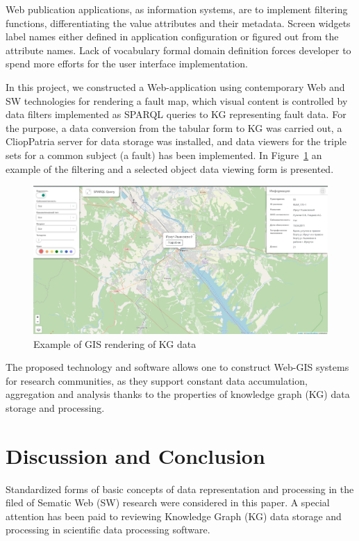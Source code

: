 \documentclass[
]{ceurart}
\begin{document}
Web publication applications, as information systems, are to implement filtering functions, differentiating the value attributes and their metadata.  Screen widgets label names either defined in application configuration or figured out from the attribute names.  Lack of vocabulary formal domain definition forces developer to spend more efforts for the user interface implementation.

In this project, we constructed a Web-application using contemporary Web and SW technologies for rendering a fault map, which visual content is controlled by data filters implemented as SPARQL queries to KG representing fault data.  For the purpose, a data conversion from the tabular form to KG was carried out, a CliopPatria server for data storage was installed, and data viewers for the triple sets for a common subject (a fault) has been implemented.  In Figure~\ref{fig:gis-ex} an example of the filtering and a selected object data viewing form is presented.
\begin{figure}
  \centering
  \includegraphics[width=\linewidth]{faults-leaflet-doc.png}
  \caption{Example of GIS rendering of KG data}
  \label{fig:gis-ex}
\end{figure}

The proposed technology and software allows one to construct Web-GIS systems for research communities, as they support constant data accumulation, aggregation and analysis thanks to the properties of knowledge graph (KG) data storage and processing.

\section{Discussion and Conclusion}
\label{sec:disc}

Standardized forms of basic concepts of data representation and processing in the filed of Sematic Web (SW) research were considered in this paper.  A special attention has been paid to reviewing Knowledge Graph (KG) data storage and processing in scientific data processing software.
\end{document}

